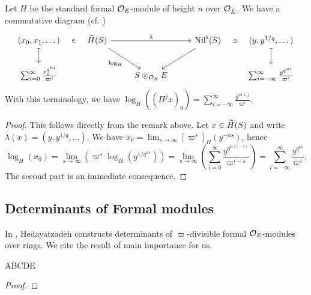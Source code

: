 \documentclass[../main.tex]{subfiles}
\begin{document}
\begin{lem}\label{lem:LogInTermsOfNil}
  Let $H$ be the standard formal $\cO_E$-module of height $n$ over $\cO_{\br
  E}$. We have a commutative diagram (cf. \cite[Lemma
  2.6.1]{BoyarchenkoWeinstein2011MaxVar})
  \begin{equation*}
  \begin{tikzcd}[ampersand replacement=\&]
  	{(x_0, x_1, \dots)} \& {\Tilde H(S)} \&\& {\Nil^\flat(S)} \& {(y,y^{1/q}, \dots)} \\
  	{\sum_{i=0}^\infty \frac{x_0^{q^{ni}}}{\varpi^i}} \&\& {S\otimes_{\cO_E}E} \&\& {\sum_{i = -\infty}^\infty\frac{y^{q^{ni}}}{\varpi^i}}
  	\arrow["\in"{description}, draw=none, from=1-1, to=1-2]
  	\arrow[maps to, from=1-1, to=2-1]
  	\arrow["\lambda", from=1-2, to=1-4]
  	\arrow["{\log_H}"', from=1-2, to=2-3]
  	\arrow[from=1-4, to=2-3]
  	\arrow["\ni"{description}, draw=none, from=1-5, to=1-4]
  	\arrow[maps to, from=1-5, to=2-5]
  \end{tikzcd}
  \end{equation*}
  With this terminology, we have $\log_H((\Pi^j x)_0) = \sum_{i = -\infty}^\infty
  \frac{ y^{ni + j}}{\varpi^i}$. 
\begin{proof}
  This follows directly from the remark above. Let $x \in \Tilde H(S)$ and write
  $\lambda(x) = (y, y^{1/q}, \dots)$. We have $x_0 = \lim_{s \to \infty}
  [\varpi^s]_H(y^{-ns})$, hence
  \begin{equation*}
    \log_H(x_0) = \lim_{s \to \infty}\left( \varpi^s \log_H(y^{1/q^{ns}})\right) = 
    \lim_{s \to \infty}\left( \sum_{i=0}^\infty
    \frac{y^{q^{n(i-s)}}}{\varpi^{i-s}}\right) = \sum_{i=-\infty}^\infty
    \frac{y^{q^{ni}}}{\varpi^i}.
  \end{equation*}
  The second part is an immediate consequence.
\end{proof}
\end{lem}




\subsection{Determinants of Formal modules} %
\label{sub:Determinants of Formal modules}
In \cite{hedayatzadeh2015det}, Hedayatzadeh constructs determinants of 
$\varpi$-divisible formal $\cO_E$-modules over  rings. 
We cite the result of main importance for us.
\begin{thm}\label{thm:HedayatzadehsResult}
  ABCDE
\begin{proof}
\end{proof}
\end{thm}
\end{document}
